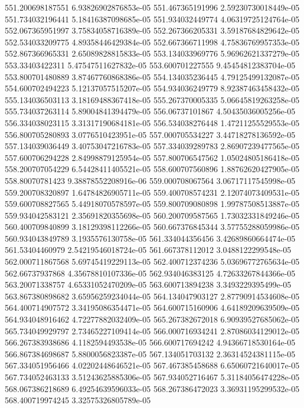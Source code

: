 {551.200698187551 6.93826902876853e-05
551.467365191996 2.59230730018449e-05
551.734032196441 5.18416387098685e-05
551.934032449774 4.06319725124764e-05
552.067365951997 3.75834058716389e-05
552.267366205331 3.59187684829642e-05
552.534033209775 4.89358446429384e-05
552.667366711998 4.75836769957353e-05
552.867366965331 2.65089828815833e-05
553.134033969776 5.96962621337279e-05
553.33403422311 5.47547511627832e-05
553.600701227555 9.45454812383704e-05
553.800701480889 3.87467760868386e-05
554.134035236445 4.79125499132087e-05
554.600702494223 5.12137057515207e-05
554.934036249779 8.92387463458432e-05
555.134036503113 3.18169488367418e-05
555.267370005335 5.06645819263258e-05
555.734037263114 5.89004841394479e-05
556.06737101867 4.50435036005256e-05
556.334038023115 3.31317190684181e-05
556.534038276448 1.47211255529553e-05
556.800705280893 3.0776510423951e-05
557.000705534227 3.44718278136592e-05
557.134039036449 3.40753047216783e-05
557.334039289783 2.86907239477565e-05
557.600706294228 2.84998879125954e-05
557.800706547562 1.05024805186418e-05
558.200707054229 6.54428411405521e-05
558.600707560896 1.88762620427905e-05
558.80070781423 9.38878552208916e-06
559.000708067564 3.06717117545998e-05
559.200708320897 1.64784826905711e-05
559.400708574231 2.12074073409531e-05
559.600708827565 5.44918070578597e-05
559.800709080898 1.99787508513887e-05
559.934042583121 2.35691820355698e-05
560.200709587565 1.73032331849246e-05
560.400709840899 3.18129398112266e-05
560.667376845344 3.57755288059986e-05
560.934043849789 3.1935576130758e-05
561.334044356456 3.42689860664474e-05
561.53404460979 2.54219546018724e-05
561.667378112012 3.0488122299548e-05
562.000711867568 5.69745419229113e-05
562.400712374236 5.03696772765634e-05
562.66737937868 4.35678810107336e-05
562.934046383125 4.72633267844366e-05
563.20071338757 4.65331052470209e-05
563.600713894238 3.3493229395499e-05
563.867380898682 3.65956259234044e-05
564.134047903127 2.87790914534608e-05
564.400714907572 3.34195086354471e-05
564.600715160906 4.64189209639509e-05
564.934048916462 4.72277882032409e-05
565.267382672018 6.90939527685062e-05
565.734049929797 2.73465227109414e-05
566.000716934241 2.87086034129012e-05
566.267383938686 4.1182594493538e-05
566.600717694242 4.94366718530164e-05
566.867384698687 5.8800056823387e-05
567.134051703132 2.36314524381115e-05
567.334051956466 4.02202448646521e-05
567.467385458688 6.65060721640017e-05
567.734052463133 3.51243625885306e-05
567.934052716467 5.31184056474228e-05
568.067386218689 6.49254639596033e-05
568.267386472023 3.36931195299532e-05
568.400719974245 3.32575326805789e-05
}
